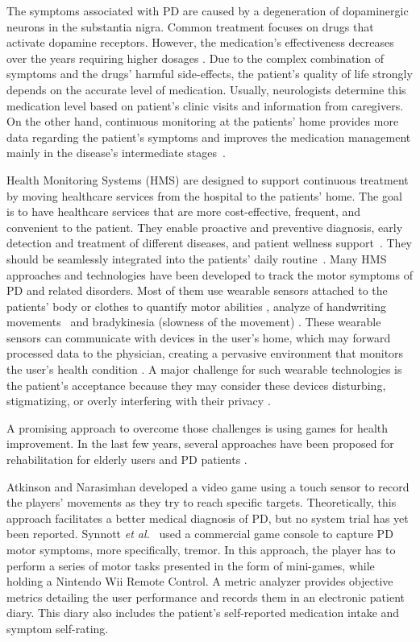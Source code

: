 \documentclass[10pt, conference, compsocconf]{IEEEtran}
\begin{document}
The symptoms associated with PD are caused by a degeneration of dopaminergic neurons in the substantia nigra. Common treatment focuses on drugs that activate dopamine receptors. However, the medication's effectiveness decreases over the years requiring higher dosages \cite{national2006parkinson}. Due to the complex combination of symptoms and the drugs' harmful side-effects, the patient's quality of life strongly depends on the accurate level of medication. Usually, neurologists determine this medication level based on patient's clinic visits and information from caregivers. On the other hand, continuous monitoring at the patients' home provides more data regarding the patient's symptoms and improves the medication management mainly in the disease's intermediate stages~\cite{national2006parkinson}.

Health Monitoring Systems (HMS) are designed to support continuous treatment by moving healthcare services from the hospital to the patients' home. The goal is to have healthcare services that are more cost-effective, frequent, and convenient to the patient. They enable proactive and preventive diagnosis, early detection and treatment of different diseases, and patient wellness support~\cite{cbmshms2015}. They should be seamlessly integrated into the patients' daily routine~\cite{alemdar2015}. Many HMS approaches and technologies have been developed to track the motor symptoms of PD and related disorders. Most of them use wearable sensors attached to the patients' body or clothes to quantify motor abilities \cite{cbmsparkglove2015,patel_monitoring_2009}, analyze of handwriting movements~\cite{cbmshandwriting2015} and bradykinesia (slowness of the movement) \cite{ambulatory2010}. These wearable sensors can communicate with devices in the user's home, which may forward processed data to the 
physician, creating a pervasive environment that monitors the user's health condition \cite{patel_monitoring_2009}. A major challenge for such wearable technologies is the patient's acceptance because they may consider these devices disturbing, stigmatizing, or overly interfering with their privacy \cite{alemdar2015}.

A promising approach to overcome those challenges is using games for health improvement. In the last few years, several approaches have been proposed for rehabilitation for elderly users \cite{brox11} and PD patients \cite{atkinson2010,synnott_wiipd_2012}. 

Atkinson and Narasimhan \cite{atkinson2010} developed a video game using a touch sensor to record the players' movements as they try to reach specific targets. Theoretically, this approach facilitates a better medical diagnosis of PD, but no system trial has yet been reported. Synnott \textit{et al.}~\cite{synnott_wiipd_2012} used a commercial game console to capture PD motor symptoms, more specifically, tremor. In this approach, the player has to perform a series of motor tasks presented in the form of mini-games, while holding a Nintendo Wii Remote Control. A metric analyzer provides objective metrics detailing the user performance and records them in an electronic patient diary. This diary also includes the patient's self-reported medication intake and symptom self-rating. 
\end{document}
